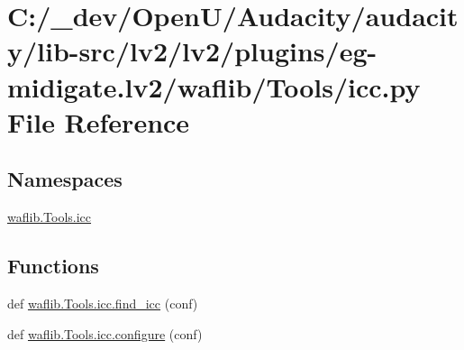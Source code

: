 \hypertarget{lv2_2plugins_2eg-midigate_8lv2_2waflib_2_tools_2icc_8py}{}\section{C\+:/\+\_\+dev/\+Open\+U/\+Audacity/audacity/lib-\/src/lv2/lv2/plugins/eg-\/midigate.lv2/waflib/\+Tools/icc.py File Reference}
\label{lv2_2plugins_2eg-midigate_8lv2_2waflib_2_tools_2icc_8py}
\subsection*{Namespaces}
\begin{DoxyCompactItemize}
\item 
 \hyperlink{namespacewaflib_1_1_tools_1_1icc}{waflib.\+Tools.\+icc}
\end{DoxyCompactItemize}
\subsection*{Functions}
\begin{DoxyCompactItemize}
\item 
def \hyperlink{namespacewaflib_1_1_tools_1_1icc_ac87401e53461cf3742295c6ca369977a}{waflib.\+Tools.\+icc.\+find\+\_\+icc} (conf)
\item 
def \hyperlink{namespacewaflib_1_1_tools_1_1icc_a29b371f4c4eaba47d7b198073638bfd9}{waflib.\+Tools.\+icc.\+configure} (conf)
\end{DoxyCompactItemize}
